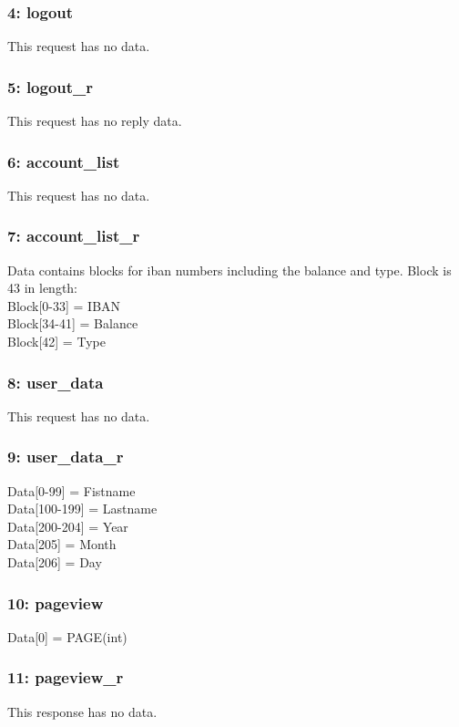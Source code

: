 \documentclass[12pt, a4paper]{article}
\begin{document}
\subsubsection{4: logout}
This request has no data.

\subsubsection{5: logout\_r}
This request has no reply data.

\subsubsection{6: account\_list}
This request has no data.

\subsubsection{7: account\_list\_r}
Data contains blocks for iban numbers including the balance and type.
Block is 43 in length:\\
Block[0-33] = IBAN\\
Block[34-41] = Balance\\
Block[42] = Type\\

\subsubsection{8: user\_data}
This request has no data.

\subsubsection{9: user\_data\_r}
Data[0-99] = Fistname\\
Data[100-199] = Lastname\\
Data[200-204] = Year\\
Data[205] = Month\\
Data[206] = Day\\

\subsubsection{10: pageview}
Data[0] = PAGE(int)

\subsubsection{11: pageview\_r}
This response has no data.
\end{document}
